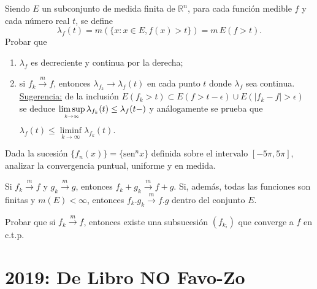 \documentclass{book}
\newcommand{\rr}{\mathbb{R}}
\begin{document}
\begin{ejer}{} 
 Siendo $E$ un subconjunto de medida finita de $\rr^n$,\;  para cada función medible $f$
y cada n\'umero real $t$, se define
$$\lambda_f(t)=m(\{x:x\in E,f(x)>t\})=m\,E(f>t).$$
Probar que 
	\begin{enumerate}
  \item $\lambda_f$ es decreciente y continua por la derecha;
  \item si $f_k \stackrel {m}{\rightarrow}f$, entonces $\lambda_{f_k} \rightarrow \lambda_f(t)$
  en cada punto $t$ donde $\lambda_f$ sea continua.
\\
  \underline{Sugerencia:}
de la inclusión $E(f_k>t)\subset E(f>t-\epsilon)\cup E(|f_k-f|>\epsilon) $
se deduce \;$\limsup\limits_{{k\rightarrow \infty}\atop} \lambda_{f_k}(t)\leq \lambda_{f}(t-)$\; y análogamente se prueba que 
\;$\lambda_f(t)\leq \liminf\limits_{k\rightarrow \infty} \lambda_{f_k}(t).\;$
	\end{enumerate}
\end{ejer}


\begin{ejer}{} 
Dada la sucesión $\{f_n(x)\}=\{\text{sen}^n x\}$ definida sobre el intervalo $[-5 \pi, 5\pi]$, 
analizar  la convergencia puntual, uniforme y en medida.
\end{ejer}



\begin{ejer}{} 
 Si $f_k \stackrel{m}{\rightarrow}f$ \;y\; $g_k \stackrel{m}{\rightarrow}g$, entonces \;
$f_k+g_k \stackrel{m}{\rightarrow}f+g$.  
Si, además, todas las funciones son finitas y $m(E)<\infty$, entonces $f_k.g_k \stackrel{m} \rightarrow f.g$
dentro del conjunto $E$.
\end{ejer}

\begin{ejer}{} 
Probar que si $f_k \stackrel{m}{\rightarrow}f$, \;entonces existe una subsucesión $(f_{k_i})$ que 
converge a $f$ en c.t.p.
\end{ejer}


\section{2019: De Libro NO Favo-Zo}
\end{document}

